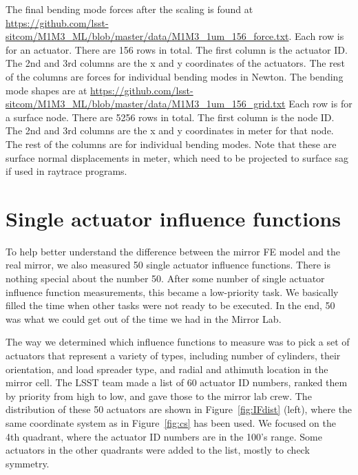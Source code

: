 \documentclass [twoside,openbib,12pt]{article}
\begin{document}
The final bending mode forces after the scaling is found at
\url{https://github.com/lsst-sitcom/M1M3_ML/blob/master/data/M1M3_1um_156_force.txt}.
Each row is for an actuator. There are 156 rows in total.
The first column is the actuator ID. The 2nd and 3rd columns are the x
and y coordinates of the actuators. The rest of the columns are forces
for individual bending modes in Newton.
The bending mode shapes are at
\url{https://github.com/lsst-sitcom/M1M3_ML/blob/master/data/M1M3_1um_156_grid.txt}
Each row is for a surface node. There are 5256 rows in total. The
first column is the node ID. The 2nd and 3rd columns are the x and y
coordinates in meter for that node. The rest of the columns are for
individual bending modes. Note that these are surface normal
displacements in meter, which need to be projected to surface sag if
used in raytrace programs.

\section{Single actuator influence functions}

To help better understand the difference between the mirror FE model
and the real mirror, we also measured 50 single actuator influence
functions. There is nothing special about the number 50. After some
number of single actuator influence function measurements, this
became a low-priority task. We basically filled the time when other
tasks were not ready to be executed.
In the end, 50 was what we could get out of the time we had in the
Mirror Lab.

The way we determined which influence functions to measure was to pick
a set of actuators that represent a variety of types, including number of
cylinders, their orientation, and load spreader type, and radial and
athimuth location in the mirror cell.
The LSST team made a list of 60 actuator ID numbers, ranked them by
priority from high to low, and gave those to the mirror lab crew.
The distribution of these 50 actuators are shown in
Figure~\ref{fig:IFdist} (left), where the same coordinate system as in
Figure~\ref{fig:cs} has been used. We focused on the 4th quadrant,
where the actuator ID numbers are in the 100's range.
Some actuators in the other quadrants were added to the list, mostly
to check symmetry.
\end{document}
